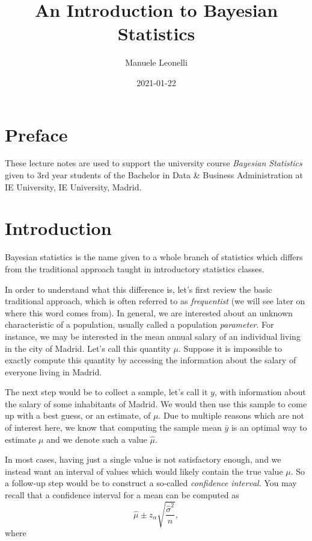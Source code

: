 \documentclass[
]{book}
\title{An Introduction to Bayesian Statistics}
\author{Manuele Leonelli}
\date{2021-01-22}
\begin{document}
\maketitle

{
\setcounter{tocdepth}{1}
\tableofcontents
}
\hypertarget{preface}{%
\chapter*{Preface}\label{preface}}

These lecture notes are used to support the university course \emph{Bayesian Statistics} given to 3rd year students of the Bachelor in Data \& Business Administration at IE University, IE University, Madrid.

\hypertarget{intro}{%
\chapter{Introduction}\label{intro}}

Bayesian statistics is the name given to a whole branch of statistics which differs from the traditional approach taught in introductory statistics classes.

In order to understand what this difference is, let's first review the basic traditional approach, which is often referred to as \emph{frequentist} (we will see later on where this word comes from). In general, we are interested about an unknown characteristic of a population, usually called a population \emph{parameter}. For instance, we may be interested in the mean annual salary of an individual living in the city of Madrid. Let's call this quantity \(\mu\). Suppose it is impossible to exactly compute this quantity by accessing the information about the salary of everyone living in Madrid.

The next step would be to collect a sample, let's call it \(y\), with information about the salary of some inhabitants of Madrid. We would then use this sample to come up with a best guess, or an estimate, of \(\mu\). Due to multiple reasons which are not of interest here, we know that computing the sample mean \(\bar{y}\) is an optimal way to estimate \(\mu\) and we denote such a value \(\hat{\mu}\).

In most cases, having just a single value is not satisfactory enough, and we instead want an interval of values which would likely contain the true value \(\mu\). So a follow-up step would be to construct a so-called \emph{confidence interval}. You may recall that a confidence interval for a mean can be computed as
\[
\hat{\mu}\pm z_{\alpha}\sqrt{\frac{\hat{\sigma}^2}{n}},
\]
where
\end{document}
